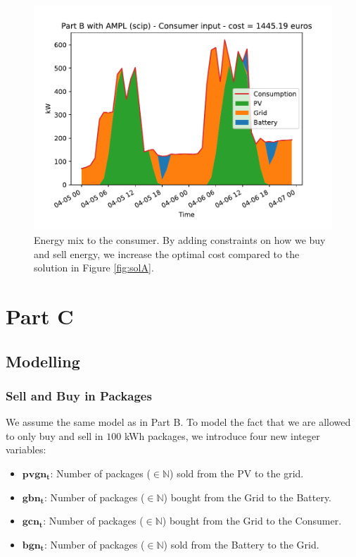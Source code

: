 \documentclass[12pt]{article}
\newcommand{\VAR}[1]{\mathbf{#1}}
\begin{document}
\begin{figure}[p]
    \centering
    \includegraphics[width=\textwidth]{figs/PartB/consumer_input}
    \caption{Energy mix to the consumer. By adding constraints on how we buy and sell energy, we increase the optimal cost compared to the solution in Figure \ref{fig:solA}.}
\end{figure}

\pagebreak

\section{Part C}

\subsection{Modelling}

\subsubsection{Sell and Buy in Packages}
We assume the same model as in Part B. To model the fact that we are allowed to only buy and sell in \(100\) kWh packages, we introduce four new integer variables:
\begin{itemize}
    \item \(\VAR{pvgn_t}\): Number of packages (\(\in \mathbb{N}\)) sold from the PV to the grid.
    \item \(\VAR{gbn_t}\): Number of packages (\(\in \mathbb{N}\)) bought from the Grid to the Battery.
    \item \(\VAR{gcn_t}\): Number of packages (\(\in \mathbb{N}\)) bought from the Grid to the Consumer.
    \item \(\VAR{bgn_t}\): Number of packages (\(\in \mathbb{N}\)) sold from the Battery to the Grid.
\end{itemize}
\end{document}
